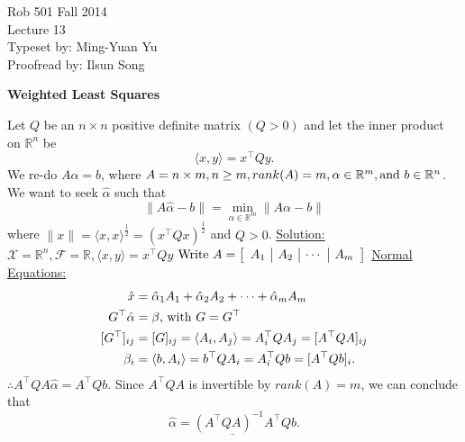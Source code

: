 \documentclass[letterpaper]{article}
\newcommand{\real}{\mathbb R}  %
\begin{document}
\baselineskip=48pt  %


\setlength{\parskip}{.3in}
\setlength{\itemsep}{.3in}

\pagestyle{plain}

{\Large \bf
\begin{center}
Rob 501 Fall 2014\\
Lecture 13\\
Typeset by:  Ming-Yuan Yu\\
Proofread by: Ilsun Song
\end{center}
}

\Large

\begin{center}
    \textbf{Weighted Least Squares}
\end{center}
    Let $Q$ be an $n \times n$ positive definite matrix $(Q>0)$
    \newline
    and let the inner product on $\real^n$ be
    \begin{equation*}
        \langle x, y \rangle = x^{\top}Qy.
    \end{equation*}
    We re-do $A \alpha = b$, where $A = n \times m, n \geq m, rank(A)=m, \alpha \in \real^m, \textnormal{and } b \in \real^n $. We want to seek $\hat{\alpha}$ such that
    \begin{equation*}
        \| A\hat{\alpha}-b \| = \min_{\alpha \in \real^m} \| A\alpha-b \|
    \end{equation*}
    where $ \| x \|=\langle x,x\rangle^{\frac{1}{2}}=(x^\top Qx)^{\frac{1}{2}} $ and $Q>0$.
    \newline\newline
    \underline{Solution:}~ $ \mathcal{X}= \real^n, \mathcal{F}=\real, \langle x, y \rangle = x^\top Qy $
    \newline
    $ \textnormal{Write } A= \left[ \begin{array}{c|c|c|c} A_1 & A_2 & \cdots & A_m\\ \end{array} \right] $
    \newline\newline
    \underline{Normal Equations:}
    \begin{align*}
        \hat{x}&=\hat{\alpha}_1 A_1 + \hat{\alpha}_2 A_2 + \cdots + \hat{\alpha}_m A_m\\
        G^\top \hat{\alpha}&=\beta \textnormal{, with } G = G^\top\\
        [G^\top]_{ij}&=[G]_{ij}=\langle A_i, A_j \rangle=A_i^\top QA_j=[A^\top QA]_{ij}\\
        \beta_i&=\langle b, A_i \rangle=b^\top QA_i=A_i^\top Qb=[A^\top Qb]_i.\\
    \end{align*}
    $ \therefore A^\top QA \hat{\alpha}=A^\top Qb.$
    \newline\newline
    Since $ A^\top QA $ is invertible by $ rank(A)=m $, we can conclude that
    \begin{equation*}
        \underline{\hat{\alpha}=(A^\top QA)^{-1}A^\top Qb}.
    \end{equation*}
\end{document}
